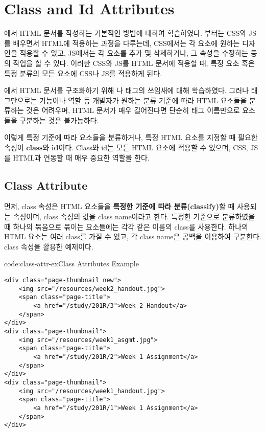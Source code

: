 \section{Class and Id Attributes} \label{sect:class-and-id-attributes}

에서 HTML 문서를 작성하는 기본적인 방법에 대하여 학습하였다. 부터는 CSS와 JS를 배우면서 HTML에 적용하는 과정을 다루는데, CSS에서는 각 요소에 원하는 디자인을 적용할 수 있고, JS에서는 각 요소를 추가 및 삭제하거나, 그 속성을 수정하는 등의 작업을 할 수 있다. 이러한 CSS와 JS를 HTML 문서에 적용할 때, 특정 요소 혹은 특정 분류의 모든 요소에 CSS나 JS를 적용하게 된다.

에서 HTML 문서를 구조화하기 위해 나  태그의 쓰임새에 대해 학습하였다. 그러나 태그만으로는 기능이나 역할 등 개발자가 원하는 분류 기준에 따라 HTML 요소들을 분류하는 것은 어려우며, HTML 문서가 매우 길어진다면 단순히 태그 이름만으로 요소들을 구분하는 것은 불가능하다.

이렇게 특정 기준에 따라 요소들을 분류하거나, 특정 HTML 요소를 지정할 때 필요한 속성이 \textbf{class}와 \textbf{id}이다. Class와 id는 모든 HTML 요소에 적용할 수 있으며, CSS, JS를 HTML과 연동할 때 매우 중요한 역할을 한다.

\subsection*{Class Attribute}
먼저, class 속성은 HTML 요소들을 \textbf{특정한 기준에 따라 분류(classify)}할 때 사용되는 속성이며, class 속성의 값을 class name이라고 한다. 특정한 기준으로 분류하였을 때 하나의 묶음으로 묶이는 요소들에는 각각 같은 이름의 class를 사용한다. 하나의 HTML 요소는 여러 class를 가질 수 있고, 각 class name은 공백을 이용하여 구분한다. \은 class 속성을 활용한 예제이다.

\begin{codeenv}{code:class-attr-ex}{Class Attributes Example}\begin{verbatim}
<div class="page-thumbnail new">
    <img src="/resources/week2_handout.jpg">
    <span class="page-title">
        <a href="/study/201R/3">Week 2 Handout</a>
    </span>
</div>
<div class="page-thumbnail">
    <img src="/resources/week1_asgmt.jpg">
    <span class="page-title">
        <a href="/study/201R/2">Week 1 Assignment</a>
    </span>
</div>
<div class="page-thumbnail">
    <img src="/resources/week1_handout.jpg">
    <span class="page-title">
        <a href="/study/201R/1">Week 1 Assignment</a>
    </span>
</div>
\end{verbatim}
\end{codeenv}
\newpage


